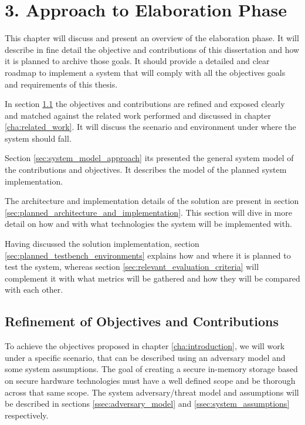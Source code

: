 
\chapter{3.	Approach to Elaboration Phase}
\label{cha:approach_to_elaboration_phase}

This chapter will discuss and present an overview of the elaboration phase. It will describe in fine detail the objective and contributions of this dissertation and how it is planned to archive those goals. It should provide a detailed and clear roadmap to implement a system that will comply with all the objectives goals and requirements of this thesis.

In section \ref{sec:refinement_of_objectives_and_contributions} the objectives and contributions are refined and exposed clearly and matched against the related work performed and discussed in chapter \ref{cha:related_work}. It will discuss the scenario and environment under where the system should fall.

Section \ref{sec:system_model_approach} its presented the general system model of the contributions and objectives. It describes the model of the planned system implementation.

The architecture and implementation details of the solution are present in section \ref{sec:planned_architecture_and_implementation}. This section will dive in more detail on how and with what technologies the system will be implemented with.

Having discussed the solution implementation, section \ref{sec:planned_testbench_environments} explains how and where it is planned to test the system, whereas section \ref{sec:relevant_evaluation_criteria} will complement it with what metrics will be gathered and how they will be compared with each other.

\section{Refinement of Objectives and Contributions} %
\label{sec:refinement_of_objectives_and_contributions}

To achieve the objectives proposed in chapter \ref{cha:introduction}, we will work under a specific scenario, that can be described using an adversary model and some system assumptions. The goal of creating a secure in-memory storage based on secure hardware technologies must have a well defined scope and be thorough across that same scope. The system adversary/threat model and assumptions will be described in sections \ref{ssec:adversary_model} and \ref{ssec:system_assumptions} respectively.

